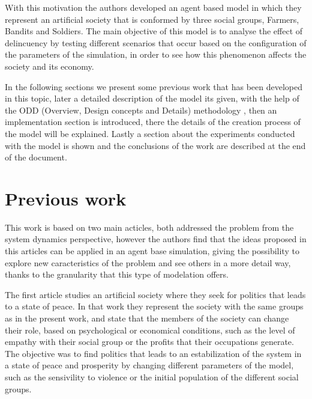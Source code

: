 \documentclass{wscpaperproc}
\theoremstyle{wsc}
\begin{document}
With this motivation the authors developed an agent based model in which they
represent an artificial society that is conformed by three social groups,
Farmers, Bandits and Soldiers. The main objective of this model is to
analyse the effect of delincuency by testing different scenarios that
occur based on the configuration of the parameters of the simulation,
in order to see how this phenomenon affects the society and its
economy.

In the following sections we present some previous work that has been developed
in this topic, later a detailed description of the model its given, with the
help of the ODD (Overview, Design concepts and Details) methodology \cite{odd},
then an implementation section is introduced, there the details of the creation
process of the model will be explained. Lastly a section about the experiments
conducted with the model is shown and the conclusions of the work are described
at the end of the document.

\section{Previous work}

This work is based on two main acticles, both addressed the problem from the     
system dynamics perspective, however the authors find that the ideas proposed in 
this articles can be applied in an agent base simulation, giving the possibility 
to explore new caracteristics of the problem and see others in a more            
detail way, thanks to the granularity that this type of modelation offers.       
                                                                                 
The first article studies an artificial society where they seek for politics     
that leads to a state of peace. In that work they represent the society with     
the same groups as in the present work, and state that the members of the        
society can change their role, based on psychological or economical conditions,   
such as the level of empathy with their social group or the profits              
that their occupations generate. The objective was to find politics              
that leads to an estabilization of the system in a state of peace and            
prosperity by changing different parameters of the model, such as the            
sensivility to violence or the initial population of the different social        
groups. \cite{article1}                                                                                                                                                                        
                                                                                 
\end{document}
